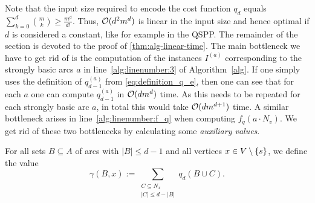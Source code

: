 Note that  the input size required to encode the cost function $q_d$ equals $\sum_{k=0}^d \binom{m}{k} \geq \frac{m^d}{d!}$. Thus, $\mathcal{O}(d^2m^d)$ is linear in the input size and hence  optimal if  $d$ is considered a constant, like for example in the QSPP.
The remainder of the section is devoted to the proof of \cref{thm:alg-linear-time}. The main bottleneck we have to get rid of is the computation of the instances $I^{(a)}$ corresponding to the strongly basic arcs $a$ in line~\ref{alg:linenumber:3} of Algorithm~\ref{alg}. If one simply uses the definition of $q^{(a)}_{d-1}$ from \cref{eq:definition_q_e}, then one can see that for each $a$ one can compute $q^{(a)}_{d-1}$ in $\mathcal{O}(dm^d)$ time. As this needs to be repeated for each strongly basic arc $a$, in total this would take $\mathcal{O}(dm^{d+1})$ time. A similar bottleneck arises in line~\ref{alg:linenumber:f_q} when computing $f_q(a \cdot N_v)$. We get rid of these two bottlenecks by calculating some %
\emph{auxiliary values}. 

For all sets $B \subseteq A$ of arcs with $|B| \leq d-1$ and all vertices $x \in V \setminus \{ s \}$, we define the  value
\begin{equation}
    \gamma(B, x) := \sum_{\substack{C \subseteq N_x\\ |C| \leq d - |B|}}q_d(B \cup C). \label{eq:helper-values}
\end{equation}
 
